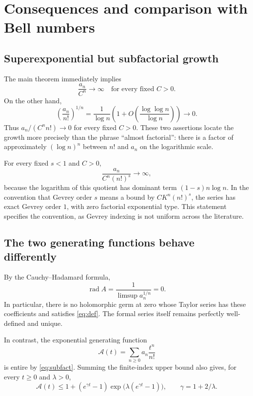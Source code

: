 \documentclass[11pt]{article}
\numberwithin{equation}{section}
\theoremstyle{definition}
\theoremstyle{remark}
\DeclareMathOperator{\rad}{rad}
\begin{document}
\section{Consequences and comparison with Bell numbers}

\subsection{Superexponential but subfactorial growth}

The main theorem immediately implies
\begin{equation}\label{eq:superexp}
 \frac{a_n}{C^n}\longrightarrow\infty
 \quad\text{for every fixed }C>0.
\end{equation}
On the other hand,
\begin{equation}\label{eq:subfact}
 \left(\frac{a_n}{n!}\right)^{1/n}
 =\frac1{\log n}\left(1+O\!\left(\frac{\log\log n}{\log n}\right)\right)
 \longrightarrow0.
\end{equation}
Thus $a_n/(C^n n!)\to0$ for every fixed $C>0$.
These two assertions locate the growth more precisely than the phrase
``almost factorial'': there is a factor of approximately
$(\log n)^n$ between $n!$ and $a_n$ on the logarithmic scale.

For every fixed $s<1$ and $C>0$,
\[
 \frac{a_n}{C^n(n!)^s}\longrightarrow\infty,
\]
because the logarithm of this quotient has dominant term
$(1-s)n\log n$. In the convention that Gevrey order $s$ means a bound
by $CK^n(n!)^s$, the series has exact Gevrey order $1$, with zero
factorial exponential type. This statement specifies the convention,
as Gevrey indexing is not uniform across the literature.

\subsection{The two generating functions behave differently}

By the Cauchy--Hadamard formula,
\[
 \rad A=\frac1{\limsup a_n^{1/n}}=0.
\]
In particular, there is no holomorphic germ at zero whose Taylor series
has these coefficients and satisfies \eqref{eq:def}. The formal series
itself remains perfectly well-defined and unique.

In contrast, the exponential generating function
\begin{equation}\label{eq:EGF}
 \mathcal A(t)=\sum_{n\ge0}a_n\frac{t^n}{n!}
\end{equation}
is entire by \eqref{eq:subfact}. Summing the finite-index upper bound
also gives, for every $t\ge0$ and $\lambda>0$,
\begin{equation}\label{eq:EGFupper}
 \mathcal A(t)\le
 1+(e^{\gamma t}-1)
       \exp\!\bigl(\lambda(e^{\gamma t}-1)\bigr),
 \qquad\gamma=1+2/\lambda.
\end{equation}
\end{document}
